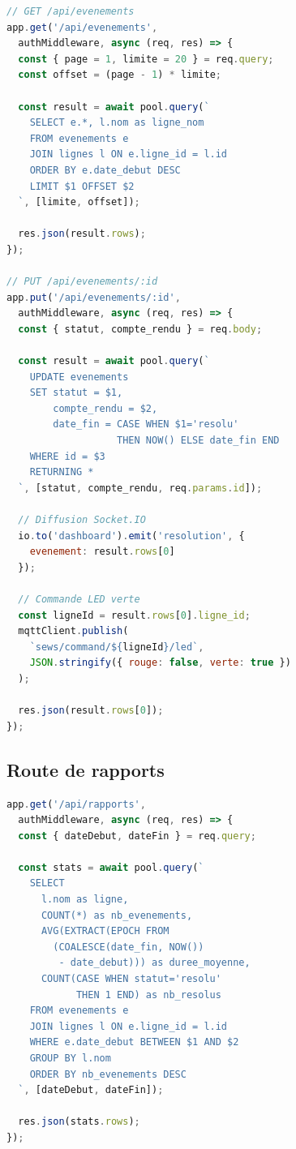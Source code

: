 \begin{lstlisting}[language=JavaScript,caption={Routes des \'ev\'enements},label={lst:routes_evenements}]
// GET /api/evenements
app.get('/api/evenements', 
  authMiddleware, async (req, res) => {
  const { page = 1, limite = 20 } = req.query;
  const offset = (page - 1) * limite;

  const result = await pool.query(`
    SELECT e.*, l.nom as ligne_nom
    FROM evenements e
    JOIN lignes l ON e.ligne_id = l.id
    ORDER BY e.date_debut DESC
    LIMIT $1 OFFSET $2
  `, [limite, offset]);

  res.json(result.rows);
});

// PUT /api/evenements/:id
app.put('/api/evenements/:id', 
  authMiddleware, async (req, res) => {
  const { statut, compte_rendu } = req.body;

  const result = await pool.query(`
    UPDATE evenements 
    SET statut = $1, 
        compte_rendu = $2,
        date_fin = CASE WHEN $1='resolu' 
                   THEN NOW() ELSE date_fin END
    WHERE id = $3
    RETURNING *
  `, [statut, compte_rendu, req.params.id]);

  // Diffusion Socket.IO
  io.to('dashboard').emit('resolution', {
    evenement: result.rows[0]
  });

  // Commande LED verte
  const ligneId = result.rows[0].ligne_id;
  mqttClient.publish(
    `sews/command/${ligneId}/led`,
    JSON.stringify({ rouge: false, verte: true })
  );

  res.json(result.rows[0]);
});
\end{lstlisting}

\subsection{Route de rapports}

\begin{lstlisting}[language=JavaScript,caption={Route de rapports},
label={lst:route_rapports}]
app.get('/api/rapports', 
  authMiddleware, async (req, res) => {
  const { dateDebut, dateFin } = req.query;

  const stats = await pool.query(`
    SELECT 
      l.nom as ligne,
      COUNT(*) as nb_evenements,
      AVG(EXTRACT(EPOCH FROM 
        (COALESCE(date_fin, NOW()) 
         - date_debut))) as duree_moyenne,
      COUNT(CASE WHEN statut='resolu' 
            THEN 1 END) as nb_resolus
    FROM evenements e
    JOIN lignes l ON e.ligne_id = l.id
    WHERE e.date_debut BETWEEN $1 AND $2
    GROUP BY l.nom
    ORDER BY nb_evenements DESC
  `, [dateDebut, dateFin]);

  res.json(stats.rows);
});
\end{lstlisting}

